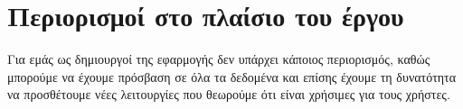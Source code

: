 \section{Περιορισμοί στο πλαίσιο του έργου}
Για εμάς ως δημιουργοί της εφαρμογής δεν υπάρχει κάποιος περιορισμός, καθώς μπορούμε να έχουμε πρόσβαση σε όλα τα δεδομένα και επίσης έχουμε τη δυνατότητα να προσθέτουμε νέες λειτουργίες που θεωρούμε ότι είναι χρήσιμες για τους χρήστες.